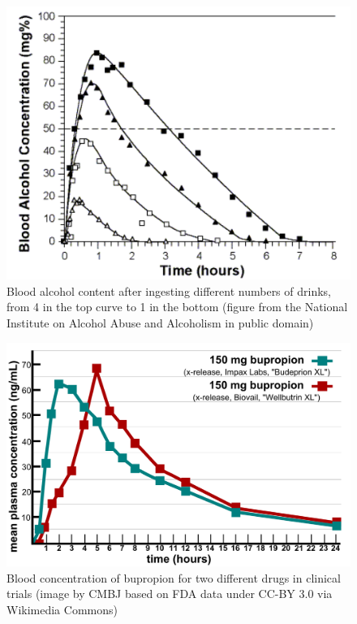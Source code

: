 \documentclass[
  letterpaper,
  DIV=11,
  numbers=noendperiod]{scrreprt}
\begin{document}
\begin{figure}

{\centering \includegraphics{./ch15/aa35graf.png}

}

\caption{Blood alcohol content after ingesting different numbers of
drinks, from 4 in the top curve to 1 in the bottom (figure from the
National Institute on Alcohol Abuse and Alcoholism in public domain)}

\end{figure}

\begin{figure}

{\centering \includegraphics{./ch15/2000px-Bupropion_bioequivalency.png}

}

\caption{Blood concentration of bupropion for two different drugs in
clinical trials (image by CMBJ based on FDA data under CC-BY 3.0 via
Wikimedia Commons)}

\end{figure}
\end{document}
